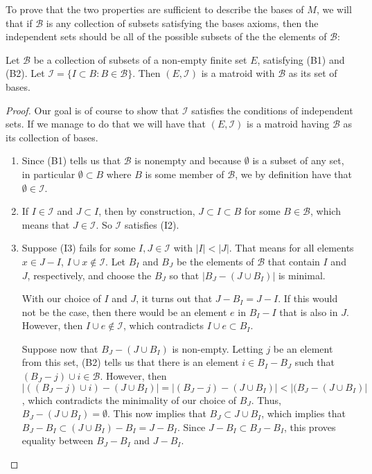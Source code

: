 To prove that the two properties are sufficient to describe the bases of $M$, we will that if $\mathcal{B}$ is any collection of subsets satisfying the bases axioms, then the independent sets should be all of the possible subsets of the the elements of $\mathcal{B}$:
\begin{theorem}
    Let $\mathcal{B}$ be a collection of subsets of a non-empty finite set $E$, satisfying (B1) and (B2). Let $\mathcal{I}=\{ I\subset B : B\in\mathcal{B} \}$. Then $(E,\mathcal{I})$ is a matroid with $\mathcal{B}$ as its set of bases.
\end{theorem}
\begin{proof}
    Our goal is of course to show that $\mathcal{I}$ satisfies the conditions of independent sets. If we manage to do that we will have that $(E, \mathcal{I})$ is a matroid having $\mathcal{B}$ as its collection of bases.
    \begin{enumerate}
        \item Since (B1) tells us that $\mathcal{B}$ is nonempty and because $\emptyset$ is a subset of any set, in particular $\emptyset \subset B$ where $B$ is some member of $\mathcal{B}$, we by definition have that $\emptyset \in \mathcal{I}$.
        
        \item If $I\in\mathcal{I}$ and $J\subset I$, then by construction, $J\subset I\subset B$ for some $B\in\mathcal{B}$, which means that $J\in\mathcal{I}$. So $\mathcal{I}$ satisfies (I2).
        
        \item Suppose (I3) fails for some $I,J\in\mathcal{I}$ with $|I|<|J|$. That means for all elements $x\in J-I$, $I\cup x \notin \mathcal{I}$. Let $B_I$ and $B_J$ be the elements of $\mathcal{B}$ that contain $I$ and $J$, respectively, and choose the $B_J$ so that $|B_J - (J\cup B_I)|$ is minimal. 
    
        With our choice of $I$ and $J$, it turns out that $J-B_I = J-I$. If this would not be the case, then there would be an element $e$ in $B_I-I$ that is also in $J$. However, then $I\cup e\notin \mathcal{I}$, which contradicts $I\cup e\subset B_I$.

        Suppose now that $B_J-(J\cup B_I)$ is non-empty. Letting $j$ be an element from this set, (B2) tells us that there is an element $i\in B_I-B_J$ such that $(B_J-j)\cup i \in\mathcal{B}$. However, then $|((B_J-j)\cup i)-(J\cup B_I)|=|(B_J-j)-(J\cup B_I)|<|(B_J-(J\cup B_I)|$, which contradicts the minimality of our choice of $B_J$. Thus, $B_J-(J\cup B_I)=\emptyset$. This now implies that $B_J\subset J\cup B_I$, which implies that $B_J-B_I\subset (J\cup B_I)-B_I=J-B_I$. Since $J-B_I\subset B_J-B_I$, this proves equality between $B_J-B_I$ and $J-B_I$.


\end{enumerate}
\end{proof}
